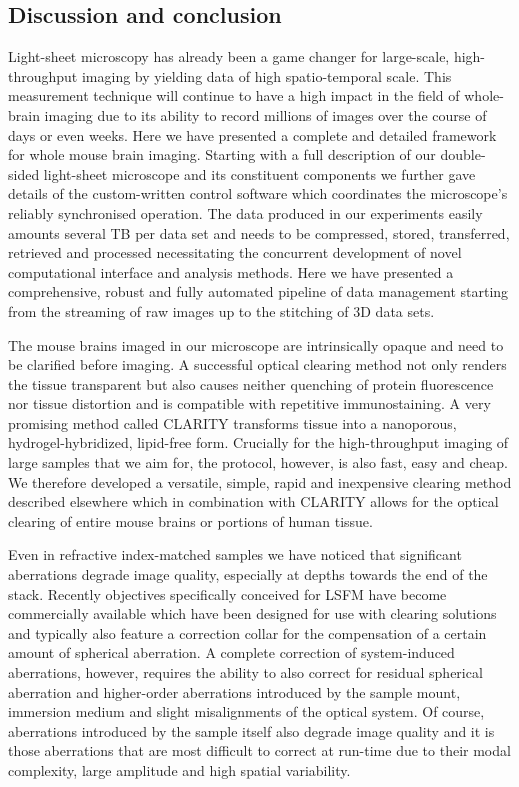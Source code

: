 \documentclass[12pt]{spieman}  %
\begin{document}
\begin{spacing}{2}
\section{Discussion and conclusion}

Light-sheet microscopy has already been a game changer for large-scale, high-throughput imaging by yielding data of high spatio-temporal scale. This measurement technique will continue to have a high impact in the field of whole-brain imaging due to its ability to record millions of images over the course of days or even weeks. Here we have presented a complete and detailed framework for whole mouse brain imaging. Starting with a full description of our double-sided light-sheet microscope and its constituent components we further gave details of the custom-written control software which coordinates the microscope's reliably synchronised operation. The data produced in our experiments easily amounts several TB per data set and needs to be compressed, stored, transferred, retrieved and processed necessitating the concurrent development of novel computational interface and analysis methods. Here we have presented a comprehensive, robust and fully automated pipeline of data management starting from the streaming of raw images up to the stitching of 3D data sets.

The mouse brains imaged in our microscope are intrinsically opaque and need to be clarified before imaging. A successful optical clearing method not only renders the tissue transparent but also causes neither quenching of protein fluorescence nor tissue distortion and is compatible with repetitive immunostaining. A very promising method called CLARITY\cite{Chung2013,Tomer2014} transforms tissue into a nanoporous, hydrogel-hybridized, lipid-free form. Crucially for the high-throughput imaging of large samples that we aim for, the protocol, however, is also fast, easy and cheap. We therefore developed a versatile, simple, rapid and inexpensive clearing method described elsewhere\cite{Costantini} which in combination with CLARITY allows for the optical clearing of entire mouse brains or portions of human tissue.

Even in refractive index-matched samples we have noticed that significant aberrations degrade image quality, especially at depths towards the end of the stack. Recently objectives specifically conceived for LSFM have become commercially available\cite{Marx2014} which have been designed for use with clearing solutions and typically also feature a correction collar for the compensation of a certain amount of spherical aberration. A complete correction of system-induced aberrations, however, requires the ability to also correct for residual spherical aberration and higher-order aberrations introduced by the sample mount, immersion medium and slight misalignments of the optical system. Of course, aberrations introduced by the sample itself also degrade image quality and it is those aberrations that are most difficult to correct at run-time due to their modal complexity, large amplitude and high spatial variability\cite{Wang2014}. 


\end{spacing}
\end{document}
